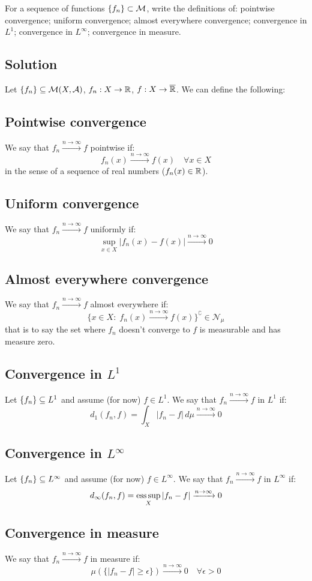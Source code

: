 
\question
For a sequence of functions $\{ f_n \} \subset \mathcal{M}$, write the definitions of: pointwise convergence; uniform convergence; almost everywhere convergence; convergence in $L^1$; convergence in $L^\infty$; convergence in measure.

\subsection*{Solution}

Let $\{ f_n \}\subseteq \mathcal{M}(X,\mathcal{A})$, $f_n:X\to\mathbb{R}$, $f:X\to\overline{\mathbb{R}}$. We can define the following:

\subsection{Pointwise convergence}
We say that $f_n \xrightarrow{n\to\infty} f$ pointwise if:
\[
    f_n(x) \xrightarrow{n\to\infty} f(x) \quad \forall x \in X
\]
in the sense of a sequence of real numbers ($f_n(x)\in\mathbb{R}$).

\subsection{Uniform convergence}
We say that $f_n \xrightarrow{n\to\infty} f$ uniformly if:
\[
    \sup_{x\in X} |f_n(x)-f(x)| \xrightarrow{n\to\infty} 0
\]

\subsection{Almost everywhere convergence}
We say that $f_n \xrightarrow{n\to\infty} f$ almost everywhere if:
\[
    \{ x\in X : \; f_n(x) \xrightarrow{n\to\infty} f(x) \}^\complement \in \mathcal{N}_\mu
\]
that is to say the set where $f_n$ doesn't converge to $f$ is measurable and has measure zero.

\subsection{Convergence in \texorpdfstring{$L^1$}{L1}}
Let $\{ f_n \}\subseteq L^1$ and assume (for now) $f\in L^1$. We say that $f_n \xrightarrow{n\to\infty} f$ in $L^1$ if:
\[
    d_1(f_n,f) = \int_X |f_n-f| \, d\mu \xrightarrow{n\to\infty} 0    
\]

\subsection{Convergence in \texorpdfstring{$L^\infty$}{Linf}}
Let $\{ f_n \}\subseteq L^\infty$ and assume (for now) $f\in L^\infty$. We say that $f_n \xrightarrow{n\to\infty} f$ in $L^\infty$ if:
\[
    d_\infty(f_n,f) = \operatorname*{ess\,sup}_X |f_n-f| \xrightarrow{n\to\infty} 0
\]

\subsection{Convergence in measure}\label{conv:meas}
We say that $f_n \xrightarrow{n\to\infty} f$ in measure if:
\[
    \mu (\{ |f_n-f| \geq \epsilon \}) \xrightarrow{n\to\infty} 0 \quad \forall \epsilon > 0   
\]
